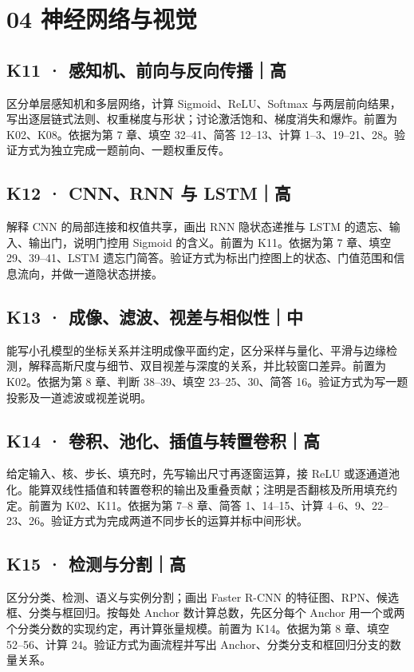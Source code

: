 \documentclass[UTF8,a4paper,11pt]{ctexart}
\begin{document}
\section{04 神经网络与视觉}
\subsection{K11 · 感知机、前向与反向传播｜高}
区分单层感知机和多层网络，计算 Sigmoid、ReLU、Softmax 与两层前向结果，写出逐层链式法则、权重梯度与形状；讨论激活饱和、梯度消失和爆炸。前置为 K02、K08。依据为第 7 章、填空 32–41、简答 12–13、计算 1–3、19–21、28。验证方式为独立完成一题前向、一题权重反传。

\subsection{K12 · CNN、RNN 与 LSTM｜高}
解释 CNN 的局部连接和权值共享，画出 RNN 隐状态递推与 LSTM 的遗忘、输入、输出门，说明门控用 Sigmoid 的含义。前置为 K11。依据为第 7 章、填空 29、39–41、LSTM 遗忘门简答。验证方式为标出门控图上的状态、门值范围和信息流向，并做一道隐状态拼接。

\subsection{K13 · 成像、滤波、视差与相似性｜中}
能写小孔模型的坐标关系并注明成像平面约定，区分采样与量化、平滑与边缘检测，解释高斯尺度与细节、双目视差与深度的关系，并比较窗口差异。前置为 K02。依据为第 8 章、判断 38–39、填空 23–25、30、简答 16。验证方式为写一题投影及一道滤波或视差说明。

\subsection{K14 · 卷积、池化、插值与转置卷积｜高}
给定输入、核、步长、填充时，先写输出尺寸再逐窗运算，接 ReLU 或逐通道池化。能算双线性插值和转置卷积的输出及重叠贡献；注明是否翻核及所用填充约定。前置为 K02、K11。依据为第 7–8 章、简答 1、14–15、计算 4–6、9、22–23、26。验证方式为完成两道不同步长的运算并标中间形状。

\subsection{K15 · 检测与分割｜高}
区分分类、检测、语义与实例分割；画出 Faster R-CNN 的特征图、RPN、候选框、分类与框回归。按每处 Anchor 数计算总数，先区分每个 Anchor 用一个或两个分类分数的实现约定，再计算张量规模。前置为 K14。依据为第 8 章、填空 52–56、计算 24。验证方式为画流程并写出 Anchor、分类分支和框回归分支的数量关系。
\end{document}
